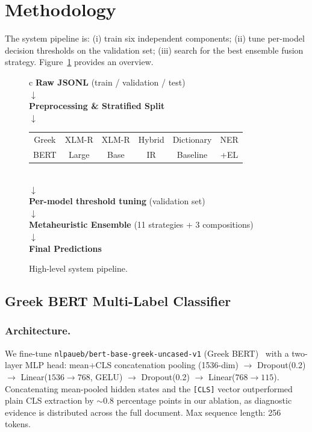 \section{Methodology}
\label{sec:method}

The system pipeline is: (i) train six independent components; (ii) tune per-model
decision thresholds on the validation set; (iii) search for the best ensemble fusion
strategy. Figure~\ref{fig:pipeline} provides an overview.

\begin{figure}[htbp]
\centering
\small
\renewcommand{\arraystretch}{1.2}
\begin{tabular}{c}
\textbf{Raw JSONL} (train / validation / test) \\
$\downarrow$ \\
\textbf{Preprocessing \& Stratified Split} \\
$\downarrow$ \\
\begin{tabular}{|c|c|c|c|c|c|}
\hline
Greek & XLM-R & XLM-R & Hybrid & Dictionary & NER \\
BERT & Large & Base & IR & Baseline & +EL \\
\hline
\end{tabular}
\\
$\downarrow$ \\
\textbf{Per-model threshold tuning} (validation set) \\
$\downarrow$ \\
\textbf{Metaheuristic Ensemble} (11 strategies + 3 compositions) \\
$\downarrow$ \\
\textbf{Final Predictions}
\end{tabular}
\caption{High-level system pipeline.}
\label{fig:pipeline}
\end{figure}

\subsection{Greek BERT Multi-Label Classifier}
\label{subsec:bert}

\subsubsection{Architecture.}
We fine-tune \texttt{nlpaueb/bert-base-greek-uncased-v1} (Greek BERT)~\cite{koutsikakis2020greekbert}
with a two-layer MLP head: mean+CLS concatenation pooling (1536-dim) $\to$ Dropout(0.2)
$\to$ Linear($1536\!\to\!768$, GELU) $\to$ Dropout(0.2) $\to$ Linear($768\!\to\!115$).
Concatenating mean-pooled hidden states and the \texttt{[CLS]} vector outperformed plain
CLS extraction by $\sim$0.8 percentage points in our ablation, as diagnostic evidence
is distributed across the full document. Max sequence length: 256 tokens.

